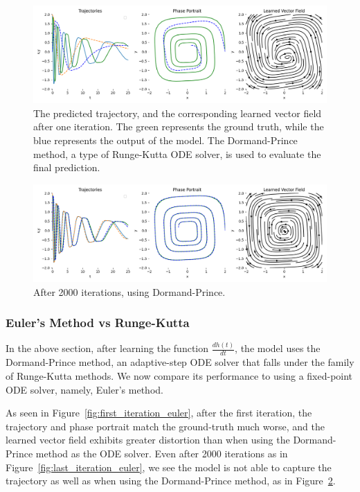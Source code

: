 \documentclass[11pt]{article}
\begin{document}
\begin{figure}
  \centering
  \includegraphics*[width=\linewidth]{000.png}
  \caption{The predicted trajectory, and the corresponding learned vector field after one iteration. The green represents the ground truth, while the blue represents the output of the model. The Dormand-Prince method, a type of Runge-Kutta ODE solver, is used to evaluate the final prediction.}
  \label{fig:first_iteration}
\end{figure}

\begin{figure}
  \centering
  \includegraphics*[width=\linewidth]{099.png}
  \caption{After 2000 iterations, using Dormand-Prince.}
  \label{fig:last_iteration}
\end{figure}

\subsubsection{Euler's Method vs Runge-Kutta}

In the above section, after learning the function $\frac{dh(t)}{dt}$, the model uses the Dormand-Prince method, an adaptive-step ODE solver that falls under the family of Runge-Kutta methods. We now compare its performance to using a fixed-point ODE solver, namely, Euler's method.

As seen in Figure~\ref{fig:first_iteration_euler}, after the first iteration, the trajectory and phase portrait match the ground-truth much worse, and the learned vector field exhibits greater distortion than when using the Dormand-Prince method as the ODE solver. Even after 2000 iterations as in Figure~\ref{fig:last_iteration_euler}, we see the model is not able to capture the trajectory as well as when using the Dormand-Prince method, as in Figure~\ref{fig:last_iteration}.
\end{document}
